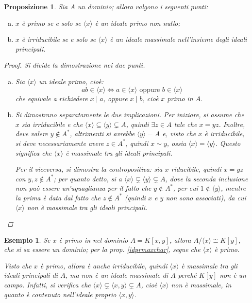 \documentclass[12pt]{scrartcl}
\theoremstyle{style}
\newtheorem{esempio}{Esempio}[section]
\newtheorem{prop}{Proposizione}[section]
\numberwithin{equation}{subsection}
\begin{document}
\begin{prop}\label{prid}
	Sia $A$ un dominio; allora valgono i seguenti punti:
	\begin{enumerate}[(a).]
		\item $x$ \`e primo se e solo se $\langle x \rangle$ \`e un ideale primo non nullo;
		\item $x$ \`e irriducibile se e solo se $\langle x \rangle$ \`e un ideale massimale nell'insieme degli ideali principali.
	\end{enumerate}
	\begin{proof}
		Si divide la dimostrazione nei due punti.
		\begin{enumerate}[(a).]
			\item Sia $\langle x \rangle$ un ideale primo, cio\`e:
		\[
		ab \in \langle x \rangle \iff a \in \langle x \rangle \text{ oppure } b \in \langle x \rangle
		\] 
		che equivale a richiedere $x  \mid a$, oppure $x \mid b$, cio\`e $x$ primo in $A$.
	\item Si dimostrano separatamente le due implicazioni.
Per iniziare, si assume che $x$ sia irriducibile e che $\langle x \rangle\subseteq \langle y \rangle\subsetneq A$, quindi $\exists z \in A$ tale che $x = yz$. 
Inoltre, deve valere $y \not\in A^*$, altrimenti si avrebbe $\langle y \rangle= A$ e, visto che $x$ \`e irriducibile, si deve necessariamente avere $z \in A^*$, quindi $x\sim y$, ossia $\langle x \rangle = \langle y \rangle$.
Questo significa che $\langle x \rangle$ \`e massimale tra gli ideali principali.

Per il viceversa, si dimostra la contropositiva: sia $x$ riducibile, quindi $x = yz$ con $y,z \not \in A^*$; per quanto detto, si a $\langle x \rangle\subsetneq \langle y \rangle\subsetneq A$, dove la seconda inclusione non pu\`o essere un'uguaglianza per il fatto che $y\not \in A^*$, per cui $1\not \in \langle y \rangle$, mentre la prima \`e data dal fatto che $z \not \in A^*$ (quindi $x$ e $y$ non sono associati), da cui $\langle x \rangle$ non \`e massimale tra gli ideali principali.
		\end{enumerate}
	\end{proof}
\end{prop}
\begin{esempio}
	Se $x$ \`e primo in nel dominio $A = K[x,y]$, allora $A / \langle x \rangle\cong K[y]$, che si sa essere un dominio; per la prop. \ref{idprmaxchar}, segue che $\langle x \rangle$ \`e primo.

	Visto che $x$ \`e primo, allora \`e anche irriducibile, quindi $\langle x \rangle$ \`e massimale tra gli ideali principali di $A$, ma non \`e un ideale massimale di $A$ perch\'e $K[y]$ non \`e un campo. 
	Infatti, si verifica che $\langle x  \rangle\subsetneq \langle x,y \rangle \subsetneq A$, cio\`e $\langle x \rangle$ non \`e massimale, in quanto \`e contenuto nell'ideale proprio $\langle x,y \rangle$.
\end{esempio}
\end{document}
